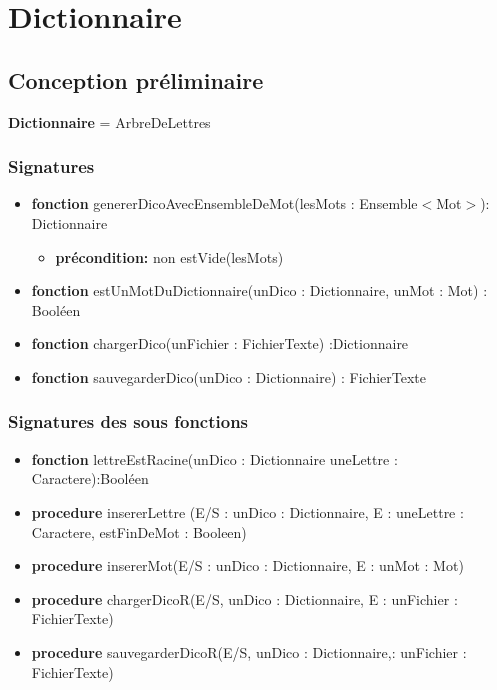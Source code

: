     \section*{Dictionnaire}
    \subsection*{Conception préliminaire}
    
    \textbf{Dictionnaire} = ArbreDeLettres
    \subsubsection*{Signatures}

	\begin{itemize}[label=$\ $, leftmargin=1cm]
		 \item \textbf{fonction} genererDicoAvecEnsembleDeMot(lesMots : Ensemble$<$Mot$>$): Dictionnaire
		 \begin{itemize}[label=$| $] 
            \item \textbf{précondition:} non estVide(lesMots) 
         \end{itemize}
		 \item \textbf{fonction} estUnMotDuDictionnaire(unDico : Dictionnaire, unMot : Mot) : Booléen
         \item \textbf{fonction} chargerDico(unFichier : FichierTexte) :Dictionnaire
         \item \textbf{fonction} sauvegarderDico(unDico : Dictionnaire) : FichierTexte
         
    
	\end{itemize}
	\subsubsection*{Signatures des sous fonctions}
	\begin{itemize}[label=$\ $, leftmargin=1cm]
		\item \textbf{fonction} lettreEstRacine(unDico : Dictionnaire uneLettre : Caractere):Booléen
        \item \textbf{procedure} insererLettre (E/S : unDico : Dictionnaire, E : uneLettre : Caractere, estFinDeMot : Booleen)
        \item \textbf{procedure} insererMot(E/S : unDico : Dictionnaire, E : unMot : Mot)
        \item \textbf{procedure} chargerDicoR(E/S, unDico : Dictionnaire, E : unFichier : FichierTexte)
        \item \textbf{procedure} sauvegarderDicoR(E/S, unDico : Dictionnaire,: unFichier : FichierTexte)
         
	\end{itemize}
	
